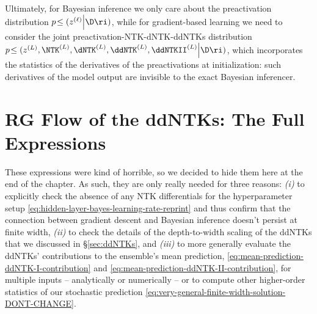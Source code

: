 Ultimately, 
for Bayesian inference we only care about the preactivation distribution $p\!\le( z^{(\ell)} \Big\vert \D \ri)$, while for gradient-based learning we need to consider the joint preactivation-NTK-dNTK-ddNTKs distribution $p\!\le( z^{(L)}, \NTK^{(L)}, \dNTK^{(L)}, \ddNTK^{(L)}, \ddNTKII^{(L)} \Big\vert \D \ri)$, 
which
incorporates the statistics of the derivatives of the preactivations at initialization: such derivatives of the model output are invisible to the exact Bayesian inferencer.











































\section{RG Flow of the ddNTKs: The Full Expressions}\label{sec:gross-ddNTK-things}
These expressions were kind of horrible, so we decided to hide them here at the end of the chapter. As such, they are only really needed for three reasons: \emph{(i)} to explicitly check the absence of any NTK differentials for the hyperparameter setup \eqref{eq:hidden-layer-bayes-learning-rate-reprint} and thus confirm that the connection between gradient descent and Bayesian inference doesn't persist at finite width, \emph{(ii)} to check the details of the depth-to-width scaling of the ddNTKs that we discussed in \S\ref{sec:ddNTKs}, and \emph{(iii)} to more generally evaluate the ddNTKs' contributions to
the ensemble's mean prediction, \eqref{eq:mean-prediction-ddNTK-I-contribution} and \eqref{eq:mean-prediction-ddNTK-II-contribution}, for multiple inputs  -- analytically or numerically --  or to compute other higher-order statistics of our stochastic prediction \eqref{eq:very-general-finite-width-solution-DONT-CHANGE}.



